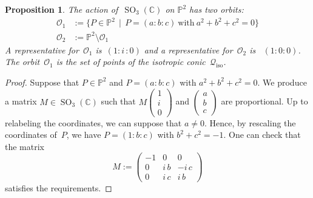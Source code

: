 \documentclass[a4paper, 11pt, reqno]{amsart}
\theoremstyle{plain}
\newtheorem{prop}[lemma]{Proposition}
\theoremstyle{definition}
\newcommand{\C}{\mathbb{C}}
\newcommand{\p}{\mathbb{P}}
\newcommand{\iii}{\textit{i}\,}
\newcommand{\iso}{\mathcal{Q}_{\mathrm{iso}}}
\newcommand{\SO}{\operatorname{SO}}
\begin{document}
\begin{prop}
\label{proposition:two_orbits}
The action of~$\SO_3(\C)$ on $\p^2$ has two orbits:
%
\begin{align*}
  \mathcal{O}_1 &:=
  \bigl\{
    P \in \p^2 \, \mid \,
    P = (a:b:c) \ \text{with} \ a^2 + b^2 + c^2 = 0
  \bigr\} \\
  \mathcal{O}_2 &:= \p^2 \setminus \mathcal{O}_1
\end{align*}
%
A representative for~$\mathcal{O}_1$ is~$(1:\iii:0)$ and a
representative for~$\mathcal{O}_2$ is~ $(1:0:0)$.
The orbit~$\mathcal{O}_1$ is the set of points of the isotropic conic~$\iso$.
\end{prop}
\begin{proof}
Suppose that $P \in \p^2$ and $P = (a:b:c)$ with $a^2 + b^2 + c^2 = 0$.
We produce a matrix $M \in \SO_3(\C)$ such that $M \left(\begin{smallmatrix} 1 \\ \iii \\ 0 \end{smallmatrix}\right)$ and $\left(\begin{smallmatrix} a \\ b \\ c \end{smallmatrix}\right)$ are proportional.
Up to relabeling the coordinates, we can suppose that $a \neq 0$.
Hence, by rescaling the coordinates of~$P$, we have $P = (1: b: c)$ with $b^2 + c^2 = -1$.
One can check that the matrix
%
\[
  M :=
  \begin{pmatrix}
    -1 & 0 & 0 \\
    0 & \iii b & -\iii c \\
    0 & \iii c & \iii b
  \end{pmatrix}
\]
%
satisfies the requirements.


\end{proof}
\end{document}
